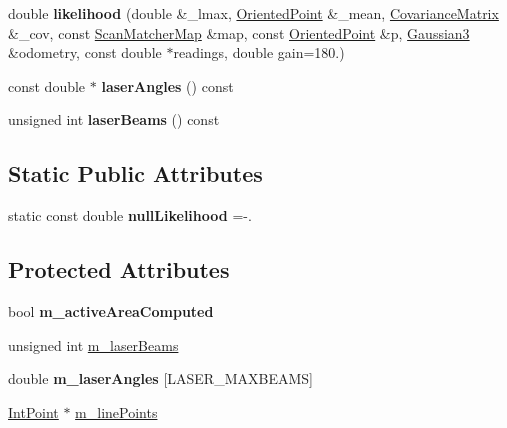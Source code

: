 \begin{DoxyCompactItemize}
\item 
\mbox{\label{classGMapping_1_1ScanMatcher_a302a6418f60c00ef955028a3d2b3b30a}} 
double {\bfseries likelihood} (double \&\+\_\+lmax, \hyperlink{structGMapping_1_1orientedpoint}{Oriented\+Point} \&\+\_\+mean, \hyperlink{structGMapping_1_1Covariance3}{Covariance\+Matrix} \&\+\_\+cov, const \hyperlink{classGMapping_1_1Map}{Scan\+Matcher\+Map} \&map, const \hyperlink{structGMapping_1_1orientedpoint}{Oriented\+Point} \&p, \hyperlink{structGMapping_1_1Gaussian3}{Gaussian3} \&odometry, const double $\ast$readings, double gain=180.)
\item 
\mbox{\label{classGMapping_1_1ScanMatcher_a26300000133c8f40c7f9d458227ff8ee}} 
const double $\ast$ {\bfseries laser\+Angles} () const
\item 
\mbox{\label{classGMapping_1_1ScanMatcher_ace8b2f94cf5eb73bd221b1acece45cad}} 
unsigned int {\bfseries laser\+Beams} () const
\end{DoxyCompactItemize}
\subsection*{Static Public Attributes}
\begin{DoxyCompactItemize}
\item 
\mbox{\label{classGMapping_1_1ScanMatcher_addb69a08f07cc87f8b60730ba449b5f1}} 
static const double {\bfseries null\+Likelihood} =-\/.
\end{DoxyCompactItemize}
\subsection*{Protected Attributes}
\begin{DoxyCompactItemize}
\item 
\mbox{\label{classGMapping_1_1ScanMatcher_ab876e0a655f97d1eb485985fe95b31d1}} 
bool {\bfseries m\+\_\+active\+Area\+Computed}
\item 
unsigned int \hyperlink{classGMapping_1_1ScanMatcher_ade447080711cbb616eb19cdd55d6a266}{m\+\_\+laser\+Beams}
\item 
\mbox{\label{classGMapping_1_1ScanMatcher_a76dd3a7a3e03a30ad99f6cca3cc9ca2b}} 
double {\bfseries m\+\_\+laser\+Angles} \mbox{[}L\+A\+S\+E\+R\+\_\+\+M\+A\+X\+B\+E\+A\+MS\mbox{]}
\item 
\hyperlink{structGMapping_1_1point}{Int\+Point} $\ast$ \hyperlink{classGMapping_1_1ScanMatcher_a73a0f19d405bb52d342e73e6152bf76a}{m\+\_\+line\+Points}
\end{DoxyCompactItemize}



